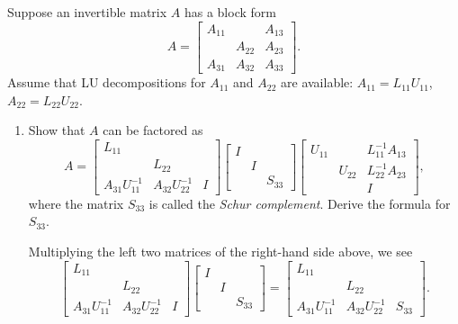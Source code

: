 \documentclass{../../../kin_math}
\begin{document}
\begin{questions}
  \question Suppose an invertible matrix $A$ has a block form
  \begin{equation}
    A = \begin{bmatrix} A_{11} & & A_{13} \\ & A_{22} & A_{23} \\ A_{31} & A_{32} & A_{33} \end{bmatrix}.
  \end{equation}
  Assume that LU decompositions for $A_{11}$ and $A_{22}$ are available: $A_{11} = L_{11} U_{11}$, $A_{22} = L_{22} U_{22}$.
  \begin{enumerate}
    \item Show that $A$ can be factored as
    \begin{equation}
      \label{eq:schur}
      A = \begin{bmatrix} L_{11} & & \\ & L_{22} & \\ A_{31} U_{11}^{-1} & A_{32} U_{22}^{-1} & I \end{bmatrix} \begin{bmatrix} I & & \\ & I & \\ & & S_{33} \end{bmatrix} \begin{bmatrix} U_{11} & & L_{11}^{-1} A_{13} \\ & U_{22} & L_{22}^{-1} A_{23} \\ & & I \end{bmatrix},
    \end{equation}
    where the matrix $S_{33}$ is called the \emph{Schur complement}. Derive the formula for $S_{33}$.
    \begin{solution}
      Multiplying the left two matrices of the right-hand side above, we see
      \begin{equation*}
        \begin{bmatrix} L_{11} & & \\ & L_{22} & \\ A_{31} U_{11}^{-1} & A_{32} U_{22}^{-1} & I \end{bmatrix} \begin{bmatrix} I & & \\ & I & \\ & & S_{33} \end{bmatrix} = \begin{bmatrix} L_{11} & & \\ & L_{22} & \\ A_{31} U_{11}^{-1} & A_{32} U_{22}^{-1} & S_{33} \end{bmatrix}.

\end{equation*}
\end{solution}
\end{enumerate}
\end{questions}
\end{document}
